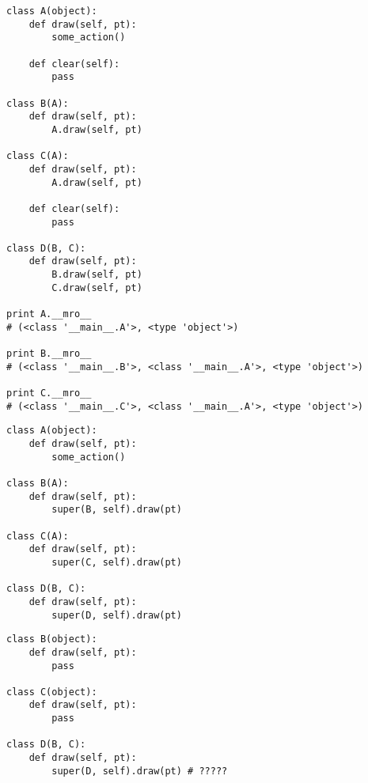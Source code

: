 \documentclass{article}
\begin{document}
{
\Large \vspace{15pt}
\begin{lstlisting}
class A(object):
    def draw(self, pt):
        some_action()

    def clear(self):
        pass

class B(A):
    def draw(self, pt):
        A.draw(self, pt)

class C(A):
    def draw(self, pt):
        A.draw(self, pt)

    def clear(self):
        pass

class D(B, C):
    def draw(self, pt):
        B.draw(self, pt)
        C.draw(self, pt)

print A.__mro__ 
# (<class '__main__.A'>, <type 'object'>)

print B.__mro__ 
# (<class '__main__.B'>, <class '__main__.A'>, <type 'object'>)

print C.__mro__ 
# (<class '__main__.C'>, <class '__main__.A'>, <type 'object'>)

\end{lstlisting}
}
\newpage
\begin{lstlisting}
class A(object):
    def draw(self, pt):
        some_action()

class B(A):
    def draw(self, pt):
        super(B, self).draw(pt)

class C(A):
    def draw(self, pt):
        super(C, self).draw(pt)

class D(B, C):
    def draw(self, pt):
        super(D, self).draw(pt)
\end{lstlisting}
\newpage


\begin{lstlisting}
class B(object):
    def draw(self, pt):
        pass

class C(object):
    def draw(self, pt):
        pass

class D(B, C):
    def draw(self, pt):
        super(D, self).draw(pt) # ?????
\end{lstlisting}
\newpage

\end{document}
